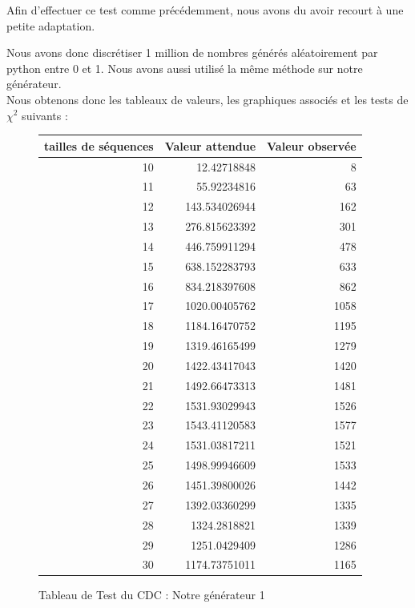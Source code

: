 \documentclass[10pt,a4paper]{article}
\begin{document}
Afin d'effectuer ce test comme précédemment, nous avons du avoir recourt à une petite adaptation. 

Nous avons donc discrétiser 1 million de nombres générés aléatoirement par python entre 0 et 1. Nous avons aussi utilisé la même méthode sur notre générateur. \\

Nous obtenons donc les tableaux de valeurs, les graphiques associés et les tests de $\chi^2$ suivants :

\begin{figure}[h]
\centering
\begin{tabular}{|r|r|r|}
\hline
tailles de séquences & Valeur attendue & Valeur observée\\
\hline
10 & 12.42718848 & 8\\
11 & 55.92234816 & 63\\
12 & 143.534026944 & 162\\
13 & 276.815623392 & 301\\
14 & 446.759911294 & 478\\
15 & 638.152283793 & 633\\
16 & 834.218397608 & 862\\
17 & 1020.00405762 & 1058\\
18 & 1184.16470752 & 1195\\
19 & 1319.46165499 & 1279\\
20 & 1422.43417043 & 1420\\
21 & 1492.66473313 & 1481\\
22 & 1531.93029943 & 1526\\
23 & 1543.41120583 & 1577\\
24 & 1531.03817211 & 1521\\
25 & 1498.99946609 & 1533\\
26 & 1451.39800026 & 1442\\
27 & 1392.03360299 & 1335\\
28 & 1324.2818821 & 1339\\
29 & 1251.0429409 & 1286\\
30 & 1174.73751011 & 1165\\
\hline
\end{tabular}
\caption{Tableau de Test du CDC : Notre générateur 1}
\end{figure}

\newpage
\end{document}
